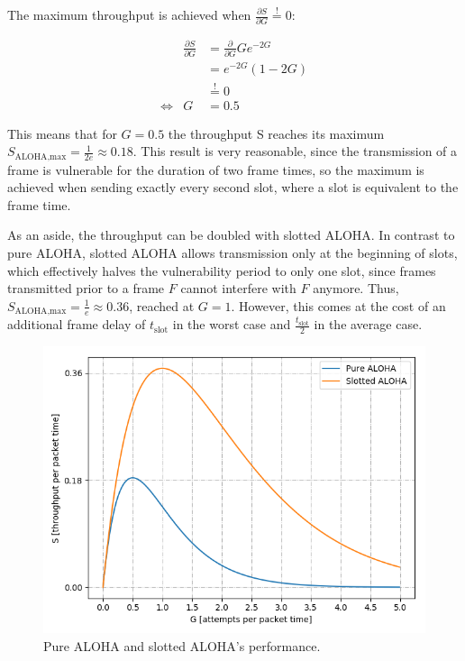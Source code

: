 \bigskip

The maximum throughput is achieved when $\frac{\partial S}{\partial G} \stackrel{!}{=} 0$:


\begin{eqnarray}
	& \frac{\partial S}{\partial G} & = \frac{\partial}{\partial G} Ge^{-2G} \\ 
	& & = e^{-2G}(1-2G) \\
	& & \stackrel{!}{=} 0 \\
	\Leftrightarrow & G & = 0.5
\end{eqnarray}
	

\bigskip

This means that for $G=0.5$ the throughput S reaches its maximum $S_\text{ALOHA,max} = \frac{1}{2e} \approx 0.18$. This result is very reasonable, since the transmission of a frame is vulnerable for the duration of two frame times, so the maximum is achieved when sending exactly every second slot, where a slot is equivalent to the frame time.

\bigskip

As an aside, the throughput can be doubled with slotted ALOHA. In contrast to pure ALOHA, slotted ALOHA allows transmission only at the beginning of slots, which effectively halves the vulnerability period to only one slot, since frames transmitted prior to a frame $F$ cannot interfere with $F$ anymore. Thus, $S_\text{ALOHA,max} = \frac{1}{e} \approx 0.36$, reached at $G=1$. However, this comes at the cost of an additional frame delay of $t_\text{slot}$ in the worst case and $\frac{t_\text{slot}}{2}$ in the average case.

\begin{figure}[h]
	\label{fig:aloha-performance}
	\begin{center}
		\includegraphics[width=13cm]{pictures/aloha_performance}
	\end{center}
	\caption{Pure ALOHA and slotted ALOHA's performance.}
\end{figure}

